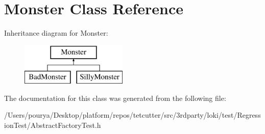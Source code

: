 \hypertarget{classMonster}{}\section{Monster Class Reference}
\label{classMonster}
Inheritance diagram for Monster\+:\begin{figure}[H]
\begin{center}
\leavevmode
\includegraphics[height=2.000000cm]{classMonster}
\end{center}
\end{figure}


The documentation for this class was generated from the following file\+:\begin{DoxyCompactItemize}
\item 
/\+Users/pourya/\+Desktop/platform/repos/tetcutter/src/3rdparty/loki/test/\+Regression\+Test/Abstract\+Factory\+Test.\+h\end{DoxyCompactItemize}
